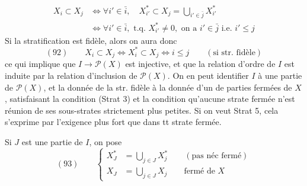 
\[
\begin{aligned}
X_i\subset X_j&\Longleftrightarrow\forall i'\in\bar i,\quad X_{i'}^*\subset X_j=\bigcup_{i'\in\bar j}X_{i'}^*\\
&\Longleftrightarrow\forall i'\in\bar i,\text{ t.q. }X_{i'}^*\neq0,\text{ on a }i'\in\bar j\text{ i.e. }i'\leq j
\end{aligned}
\]
Si la stratification est fidèle, alors on aura donc
\[
(92)\qquad X_i\subset X_j\Longleftrightarrow X_i^*\subset X_j\Longleftrightarrow i\leq j\qquad(\text{si str. fidèle})
\]
ce qui implique que $I\longrightarrow\mathcal P(X)$ est injective, et que la relation d'ordre de $I$ est induite par la relation d'inclusion de $\mathcal P(X)$. On en peut identifier $I$ à une partie de $\mathcal P(X)$, et la donnée de la str. fidèle à la donnée d'un   de parties fermées  de $X$,  satisfaisant la condition (Strat 3)  et la condition qu'aucune strate fermée n'est réunion de ses sous-strates strictement plus petites. Si on veut Strat 5, cela s'exprime par l'exigence plus fort que dans tt strate fermée.

Si $J$ est une partie de $I$, on pose
\[
(93)\qquad\left\{
\begin{aligned}
X_J^*&=\bigcup_{j\in J}X_j^*\qquad(\text{pas néc fermé})\\
X_J&=\bigcup_{j\in J}X_j\qquad\text{fermé de }X
\end{aligned}\right.
\]
